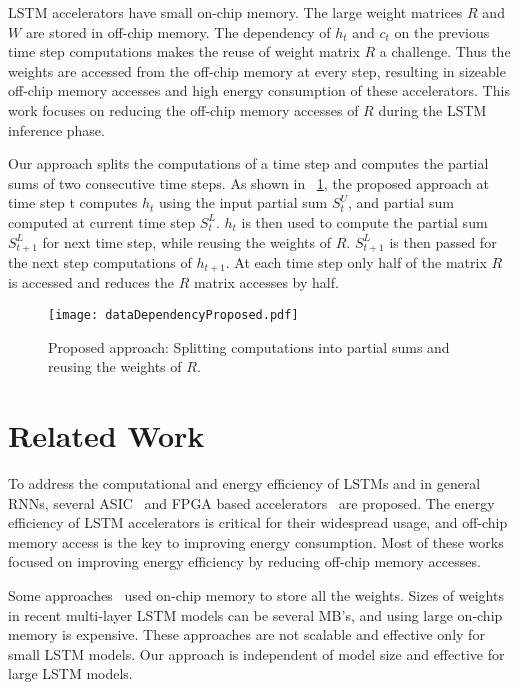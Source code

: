 LSTM accelerators have small on-chip memory. The large weight matrices $R$ and $W$ are stored in off-chip memory. The dependency of $h_{t}$ and $c_{t}$ on the previous time step computations makes the reuse of weight matrix $R$ a challenge. Thus the weights are accessed from the off-chip memory at every step, resulting in sizeable off-chip memory accesses and high energy consumption of these accelerators. This work focuses on reducing the off-chip memory accesses of $R$ during the LSTM inference phase. 

Our approach splits the computations of a time step and computes the partial sums of two consecutive time steps. As shown in \figurename{~\ref{fig:dataDependencyProposed}}, the proposed approach at time step t computes $h_t$ using the input partial sum $S^U_t$, and partial sum computed at current time step $S^L_t$. $h_t$ is then used to compute the partial sum $S^L_{t{+}1}$ for next time step, while reusing the weights of $R$. $S^L_{t{+}1}$ is then passed for the next step computations of $h_{t{+}1}$. At each time step only half of the matrix $R$ is accessed and reduces the $R$ matrix accesses by half.
\begin{figure}[!htb]
	\centerline{\texttt{[image: dataDependencyProposed.pdf]}}
	\caption{Proposed approach: Splitting computations into partial sums and reusing the weights of $R$.}
	\label{fig:dataDependencyProposed}
\end{figure}
\section{Related Work}
To address the computational and energy efficiency of LSTMs and in general RNNs, several ASIC~\cite{conti2018chipmunk,wang2017accelerating,azari2020elsa} and FPGA based accelerators~\cite{chang2015recurrent,ferreira2016fpga,lee2016fpga,guan2017fpga,han2017ese} are proposed. The energy efficiency of LSTM accelerators is critical for their widespread usage, and off-chip memory access is the key to improving energy consumption. Most of these works focused on improving energy efficiency by reducing off-chip memory accesses.

Some approaches~\cite{lee2016fpga, rybalkin2018finn, ferreira2016fpga} used on-chip memory to store all the weights. Sizes of weights in recent multi-layer LSTM models can be several MB's, and using large on-chip memory is expensive. These approaches are not scalable and effective only for small LSTM models. Our approach is independent of model size and effective for large LSTM models.

